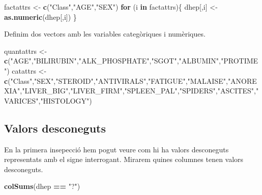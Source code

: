 \documentclass[]{article}
\newenvironment{Shaded}{\begin{snugshade}}{\end{snugshade}}
\newcommand{\ControlFlowTok}[1]{\textcolor[rgb]{0.13,0.29,0.53}{\textbf{#1}}}
\newcommand{\KeywordTok}[1]{\textcolor[rgb]{0.13,0.29,0.53}{\textbf{#1}}}
\newcommand{\NormalTok}[1]{#1}
\newcommand{\OperatorTok}[1]{\textcolor[rgb]{0.81,0.36,0.00}{\textbf{#1}}}
\newcommand{\StringTok}[1]{\textcolor[rgb]{0.31,0.60,0.02}{#1}}
\begin{document}
\begin{Shaded}
\begin{Highlighting}[]
\NormalTok{factattrs <-}\StringTok{ }\KeywordTok{c}\NormalTok{(}\StringTok{"Class"}\NormalTok{,}\StringTok{"AGE"}\NormalTok{,}\StringTok{"SEX"}\NormalTok{)}
\ControlFlowTok{for}\NormalTok{ (i }\ControlFlowTok{in}\NormalTok{ factattrs)\{}
\NormalTok{  dhep[,i] <-}\StringTok{ }\KeywordTok{as.numeric}\NormalTok{(dhep[,i])}
\NormalTok{\}}
\end{Highlighting}
\end{Shaded}

Definim dos vectors amb les variables categòriques i numèriques.

\begin{Shaded}
\begin{Highlighting}[]
\NormalTok{quantattrs <-}\StringTok{ }\KeywordTok{c}\NormalTok{(}\StringTok{"AGE"}\NormalTok{,}\StringTok{"BILIRUBIN"}\NormalTok{,}\StringTok{"ALK_PHOSPHATE"}\NormalTok{,}\StringTok{"SGOT"}\NormalTok{,}\StringTok{"ALBUMIN"}\NormalTok{,}\StringTok{"PROTIME"}\NormalTok{)}
\NormalTok{catattrs <-}\StringTok{ }\KeywordTok{c}\NormalTok{(}\StringTok{"Class"}\NormalTok{,}\StringTok{"SEX"}\NormalTok{,}\StringTok{"STEROID"}\NormalTok{,}\StringTok{"ANTIVIRALS"}\NormalTok{,}\StringTok{"FATIGUE"}\NormalTok{,}\StringTok{"MALAISE"}\NormalTok{,}\StringTok{"ANOREXIA"}\NormalTok{,}\StringTok{"LIVER_BIG"}\NormalTok{,}\StringTok{"LIVER_FIRM"}\NormalTok{,}\StringTok{"SPLEEN_PAL"}\NormalTok{,}\StringTok{"SPIDERS"}\NormalTok{,}\StringTok{"ASCITES"}\NormalTok{,}\StringTok{"VARICES"}\NormalTok{,}\StringTok{"HISTOLOGY"}\NormalTok{)}
\end{Highlighting}
\end{Shaded}

\hypertarget{valors-desconeguts}{%
\subsection{Valors desconeguts}\label{valors-desconeguts}}

En la primera insepecció hem pogut veure com hi ha valors desconeguts
representats amb el signe interrogant. Mirarem quines columnes tenen
valors desconeguts.

\begin{Shaded}
\begin{Highlighting}[]
\KeywordTok{colSums}\NormalTok{(dhep }\OperatorTok{==}\StringTok{ "?"}\NormalTok{)}
\end{Highlighting}
\end{Shaded}
\end{document}
